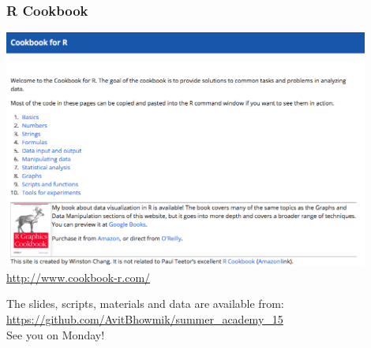 \documentclass{beamer}
\begin{document}

\begin{frame}
\frametitle{R Cookbook}
\centering
\includegraphics[width=0.9\textwidth]{Figures/cookbook.png}\\
\href{http://www.cookbook-r.com/}{http://www.cookbook-r.com/}
\end{frame}


\begin{frame}
\centering
The slides, scripts, materials and data are available from:\\
\href{https://github.com/AvitBhowmik/summer_academy_15}{\alert{https://github.com/AvitBhowmik/summer_academy_15}}\\
\vspace{1cm}
\Huge See you on Monday!
\end{frame}

\end{document}
